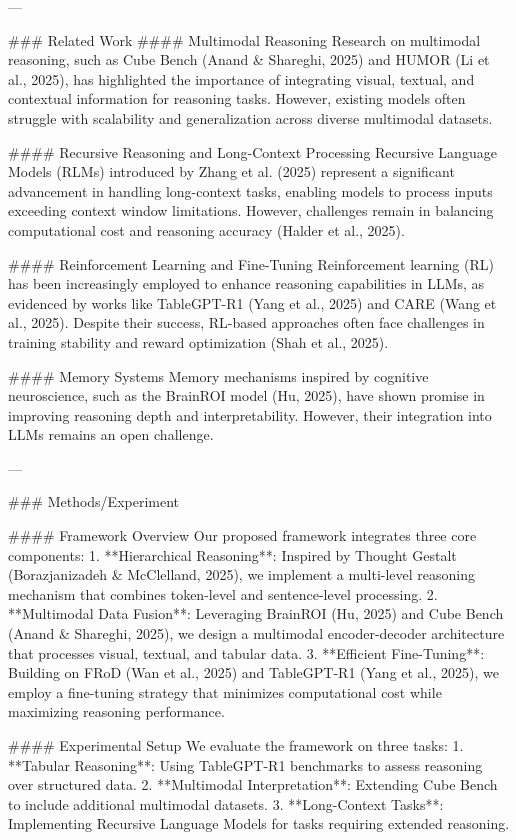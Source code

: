 ---

### Related Work  
#### Multimodal Reasoning  
Research on multimodal reasoning, such as Cube Bench (Anand & Shareghi, 2025) and HUMOR (Li et al., 2025), has highlighted the importance of integrating visual, textual, and contextual information for reasoning tasks. However, existing models often struggle with scalability and generalization across diverse multimodal datasets.  

#### Recursive Reasoning and Long-Context Processing  
Recursive Language Models (RLMs) introduced by Zhang et al. (2025) represent a significant advancement in handling long-context tasks, enabling models to process inputs exceeding context window limitations. However, challenges remain in balancing computational cost and reasoning accuracy (Halder et al., 2025).  

#### Reinforcement Learning and Fine-Tuning  
Reinforcement learning (RL) has been increasingly employed to enhance reasoning capabilities in LLMs, as evidenced by works like TableGPT-R1 (Yang et al., 2025) and CARE (Wang et al., 2025). Despite their success, RL-based approaches often face challenges in training stability and reward optimization (Shah et al., 2025).  

#### Memory Systems  
Memory mechanisms inspired by cognitive neuroscience, such as the BrainROI model (Hu, 2025), have shown promise in improving reasoning depth and interpretability. However, their integration into LLMs remains an open challenge.  

---

### Methods/Experiment  

#### Framework Overview  
Our proposed framework integrates three core components:  
1. **Hierarchical Reasoning**: Inspired by Thought Gestalt (Borazjanizadeh & McClelland, 2025), we implement a multi-level reasoning mechanism that combines token-level and sentence-level processing.  
2. **Multimodal Data Fusion**: Leveraging BrainROI (Hu, 2025) and Cube Bench (Anand & Shareghi, 2025), we design a multimodal encoder-decoder architecture that processes visual, textual, and tabular data.  
3. **Efficient Fine-Tuning**: Building on FRoD (Wan et al., 2025) and TableGPT-R1 (Yang et al., 2025), we employ a fine-tuning strategy that minimizes computational cost while maximizing reasoning performance.  

#### Experimental Setup  
We evaluate the framework on three tasks:  
1. **Tabular Reasoning**: Using TableGPT-R1 benchmarks to assess reasoning over structured data.  
2. **Multimodal Interpretation**: Extending Cube Bench to include additional multimodal datasets.  
3. **Long-Context Tasks**: Implementing Recursive Language Models for tasks requiring extended reasoning.  

